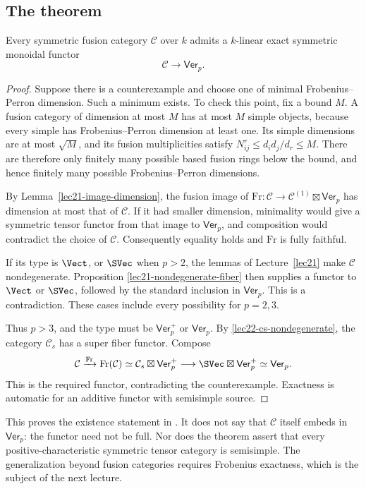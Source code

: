 \subsection{The theorem}
\begin{theorem}[Ostrik]\label{lec22-ostrik}
Every symmetric fusion category $\mathcal C$ over $k$ admits a $k$-linear
exact symmetric monoidal functor
\[
 \mathcal C\longrightarrow\mathsf{Ver}_p.
\]
\end{theorem}
\begin{proof}
Suppose there is a counterexample and choose one of minimal
Frobenius--Perron dimension. Such a minimum exists. To check this point,
fix a bound $M$. A fusion category of dimension at most $M$ has at most
$M$ simple objects, because every simple has Frobenius--Perron dimension
at least one. Its simple dimensions are at most $\sqrt M$, and its fusion
multiplicities satisfy
$N_{ij}^r\leq d_i d_j/d_r\leq M$. There are therefore only finitely many
possible based fusion rings below the bound, and hence finitely many
possible Frobenius--Perron dimensions.

By Lemma~\ref{lec21-image-dimension}, the fusion image of
$\mathrm{Fr}:\mathcal C\to\mathcal C^{(1)}\boxtimes\mathsf{Ver}_p$ has
dimension at most that of $\mathcal C$. If it had smaller dimension,
minimality would give a symmetric tensor functor from that image to
$\mathsf{Ver}_p$, and composition would contradict the choice of
$\mathcal C$. Consequently equality holds and $\mathrm{Fr}$ is fully
faithful.

If its type is $\Vect$, or $\SVec$ when $p>2$, the lemmas of
Lecture~\ref{lec21} make $\mathcal C$ nondegenerate. Proposition
\ref{lec21-nondegenerate-fiber} then supplies a functor to $\Vect$ or
$\SVec$, followed by the standard inclusion in $\mathsf{Ver}_p$.
This is a contradiction. These cases include every possibility for
$p=2,3$.

Thus $p>3$, and the type must be $\mathsf{Ver}_p^+$ or $\mathsf{Ver}_p$.
By \eqref{lec22-cs-nondegenerate}, the category $\mathcal C_s$ has a super
fiber functor. Compose
\[
 \mathcal C\xrightarrow{\mathrm{Fr}}\mathrm{Fr}(\mathcal C)
 \simeq\mathcal C_s\boxtimes\mathsf{Ver}_p^+
 \longrightarrow\SVec\boxtimes\mathsf{Ver}_p^+
 \simeq\mathsf{Ver}_p.
\]
This is the required functor, contradicting the counterexample. Exactness
is automatic for an additive functor with semisimple source.
\end{proof}

\begin{remark}
This proves the existence statement in \cite[Theorem 1.5]{OstrikVerlinde}.
It does not say that $\mathcal C$ itself embeds in $\mathsf{Ver}_p$:
the functor need not be full. Nor does the theorem assert that every
positive-characteristic symmetric tensor category is semisimple.
The generalization beyond fusion categories requires Frobenius exactness,
which is the subject of the next lecture.
\end{remark}
